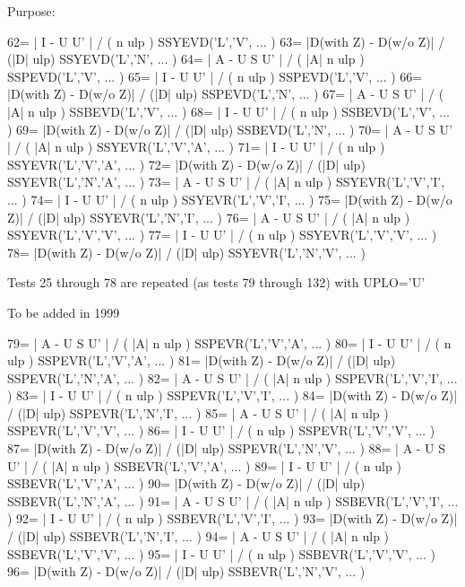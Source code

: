 \begin{DoxyParagraph}{Purpose\+: }
\begin{DoxyVerb}
    62= | I - U U' | / ( n ulp )              SSYEVD('L','V', ... )
    63= |D(with Z) - D(w/o Z)| / (|D| ulp)    SSYEVD('L','N', ... )
    64= | A - U S U' | / ( |A| n ulp )        SSPEVD('L','V', ... )
    65= | I - U U' | / ( n ulp )              SSPEVD('L','V', ... )
    66= |D(with Z) - D(w/o Z)| / (|D| ulp)    SSPEVD('L','N', ... )
    67= | A - U S U' | / ( |A| n ulp )        SSBEVD('L','V', ... )
    68= | I - U U' | / ( n ulp )              SSBEVD('L','V', ... )
    69= |D(with Z) - D(w/o Z)| / (|D| ulp)    SSBEVD('L','N', ... )
    70= | A - U S U' | / ( |A| n ulp )        SSYEVR('L','V','A', ... )
    71= | I - U U' | / ( n ulp )              SSYEVR('L','V','A', ... )
    72= |D(with Z) - D(w/o Z)| / (|D| ulp)    SSYEVR('L','N','A', ... )
    73= | A - U S U' | / ( |A| n ulp )        SSYEVR('L','V','I', ... )
    74= | I - U U' | / ( n ulp )              SSYEVR('L','V','I', ... )
    75= |D(with Z) - D(w/o Z)| / (|D| ulp)    SSYEVR('L','N','I', ... )
    76= | A - U S U' | / ( |A| n ulp )        SSYEVR('L','V','V', ... )
    77= | I - U U' | / ( n ulp )              SSYEVR('L','V','V', ... )
    78= |D(with Z) - D(w/o Z)| / (|D| ulp)    SSYEVR('L','N','V', ... )

    Tests 25 through 78 are repeated (as tests 79 through 132)
    with UPLO='U'

    To be added in 1999

    79= | A - U S U' | / ( |A| n ulp )        SSPEVR('L','V','A', ... )
    80= | I - U U' | / ( n ulp )              SSPEVR('L','V','A', ... )
    81= |D(with Z) - D(w/o Z)| / (|D| ulp)    SSPEVR('L','N','A', ... )
    82= | A - U S U' | / ( |A| n ulp )        SSPEVR('L','V','I', ... )
    83= | I - U U' | / ( n ulp )              SSPEVR('L','V','I', ... )
    84= |D(with Z) - D(w/o Z)| / (|D| ulp)    SSPEVR('L','N','I', ... )
    85= | A - U S U' | / ( |A| n ulp )        SSPEVR('L','V','V', ... )
    86= | I - U U' | / ( n ulp )              SSPEVR('L','V','V', ... )
    87= |D(with Z) - D(w/o Z)| / (|D| ulp)    SSPEVR('L','N','V', ... )
    88= | A - U S U' | / ( |A| n ulp )        SSBEVR('L','V','A', ... )
    89= | I - U U' | / ( n ulp )              SSBEVR('L','V','A', ... )
    90= |D(with Z) - D(w/o Z)| / (|D| ulp)    SSBEVR('L','N','A', ... )
    91= | A - U S U' | / ( |A| n ulp )        SSBEVR('L','V','I', ... )
    92= | I - U U' | / ( n ulp )              SSBEVR('L','V','I', ... )
    93= |D(with Z) - D(w/o Z)| / (|D| ulp)    SSBEVR('L','N','I', ... )
    94= | A - U S U' | / ( |A| n ulp )        SSBEVR('L','V','V', ... )
    95= | I - U U' | / ( n ulp )              SSBEVR('L','V','V', ... )
    96= |D(with Z) - D(w/o Z)| / (|D| ulp)    SSBEVR('L','N','V', ... )\end{DoxyVerb}
 
\end{DoxyParagraph}
